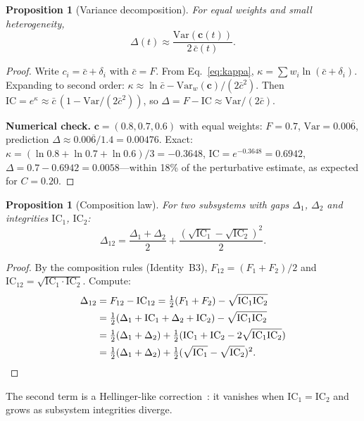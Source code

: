 \documentclass[
  aps,
  prd,
  twocolumn,
  superscriptaddress,
  nofootinbib,
  floatfix
]{revtex4-2}
\newtheorem{proposition}[theorem]{Proposition}
\newcommand{\beq}{\begin{equation}}
\newcommand{\eeq}{\end{equation}}
\newcommand{\tvec}{\mathbf{c}}
\newcommand{\IC}{\mathrm{IC}}
\begin{document}
\begin{proposition}[Variance decomposition]
\label{prop:variance}
For equal weights and small heterogeneity,
\beq
  \Delta(t) \approx
  \frac{\mathrm{Var}(\tvec(t))}{2\,\bar{c}(t)}.
\eeq
\end{proposition}

\begin{proof}
Write $c_i = \bar{c} + \delta_i$ with $\bar{c} = F$.  From
Eq.~\ref{eq:kappa}, $\kappa = \sum w_i \ln(\bar{c} + \delta_i)$.
Expanding to second order:
$\kappa \approx \ln\bar{c} - \mathrm{Var}_w(\tvec)/(2\bar{c}^2)$.
Then $\IC = e^\kappa \approx \bar{c}\,(1 - \mathrm{Var}/(2\bar{c}^2))$,
so $\Delta = F - \IC \approx \mathrm{Var}/(2\bar{c})$.

\noindent\textbf{Numerical check.}  $\tvec = (0.8, 0.7, 0.6)$
with equal weights: $F = 0.7$, $\mathrm{Var} = 0.00\overline{6}$,
prediction $\Delta \approx 0.00\overline{6}/1.4 = 0.00476$.
Exact: $\kappa = (\ln 0.8 + \ln 0.7 + \ln 0.6)/3 = -0.3648$,
$\IC = e^{-0.3648} = 0.6942$,
$\Delta = 0.7 - 0.6942 = 0.0058$---within 18\% of the
perturbative estimate, as expected for $C = 0.20$.
\end{proof}

\begin{proposition}[Composition law]
\label{prop:gap_comp}
For two subsystems with gaps $\Delta_1$, $\Delta_2$ and
integrities $\IC_1$, $\IC_2$:
\beq
  \Delta_{12} = \frac{\Delta_1+\Delta_2}{2}
    + \frac{(\sqrt{\IC_1}-\sqrt{\IC_2})^2}{2}.
\eeq
\end{proposition}

\begin{proof}
By the composition rules (Identity~B3), $F_{12} = (F_1 + F_2)/2$
and $\IC_{12} = \sqrt{\IC_1 \cdot \IC_2}$.  Compute:
\begin{align*}
  \Delta_{12}
  &= F_{12} - \IC_{12}
   = \tfrac{1}{2}(F_1 + F_2) - \sqrt{\IC_1 \IC_2} \\
  &= \tfrac{1}{2}(\Delta_1 + \IC_1 + \Delta_2 + \IC_2)
     - \sqrt{\IC_1 \IC_2} \\
  &= \tfrac{1}{2}(\Delta_1 + \Delta_2)
     + \tfrac{1}{2}(\IC_1 + \IC_2 - 2\sqrt{\IC_1\IC_2}) \\
  &= \tfrac{1}{2}(\Delta_1 + \Delta_2)
     + \tfrac{1}{2}(\sqrt{\IC_1} - \sqrt{\IC_2})^2.\qedhere
\end{align*}
\end{proof}

\noindent The second term is a Hellinger-like
correction~\cite{hellinger1909}: it vanishes when
$\IC_1 = \IC_2$ and grows as subsystem integrities diverge.
\end{document}
